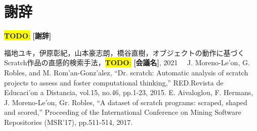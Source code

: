 \documentclass[uplatex,dvipdfmx,a4paper,twocolumn,base=11pt,jbase=11pt,ja=standard]{bxjsarticle}  %
\newcommand{\todo}[1]{\colorbox{yellow}{{\bf TODO}:}{\color{red} {\textbf{[#1]}}}}
\begin{document}
\section*{謝辞}

\todo{謝辞}

\begin{thebibliography}{1}
   福地ユキ，伊原彰紀，山本豪志朗，橋谷直樹，オブジェクトの動作に基づくScratch作品の直感的検索手法，\todo{会議名}, 2021
  　J. Moreno-Le'on, G. Robles, and M. Rom'an-Gonz'alez, ``Dr. scratch: Automatic analysis of scratch projects to assess and foster computational thinking,'' RED.Revista de Educaci'on a Distancia, vol.15, no.46, pp.1-23, 2015.
   E. Aivaloglou, F. Hermans, J. Moreno-Le'on, Gr. Robles, ``A dataset of scratch programs: scraped, shaped and scored,'' Proceeding of the International Conference on Mining Software Repositories (MSR'17), pp.511-514, 2017. 

\end{thebibliography}





%
\end{document}
